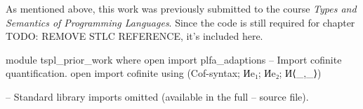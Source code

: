 As mentioned above, this work was previously submitted to the course \textit{Types and Semantics of
Programming Languages}. Since the code is still required for chapter
TODO: REMOVE STLC REFERENCE, it's included here.

\begin{code}
module tspl_prior_work where
  open import plfa_adaptions
  -- Import cofinite quantification.
  open import cofinite using (Cof-syntax; Иe₁; Иe₂; И⟨_,_⟩) 

  -- Standard library imports omitted (available in the full
  -- source file).
\end{code}
\begin{comment}
  \begin{code}
  -- Data types (naturals, strings, characters)
  open import Data.Nat using (ℕ; zero; suc; _<_; _≥_; _≤_; _≤?_; _<?_; z≤n; s≤s; _⊔_)
    renaming (_≟_ to _≟ℕ_)
  open import Data.Nat.Properties using (≤-refl; ≤-trans; ≤-<-trans; <-≤-trans; ≤-antisym; ≤-total;
    +-mono-≤; n≤1+n; m≤n⇒m≤1+n; suc-injective; <⇒≢; ≰⇒>; ≮⇒≥)
  open import Data.String using (String; fromList; toList) renaming (_≟_ to _≟str_;
    _++_ to _++str_; length to str-length)
  open import Data.Char using (Char)
  open import Data.Char.Properties using () renaming (_≟_ to _≟char_)
  
  -- Function manipulation.
  open import Function using (_∘_; flip; it; id; case_returning_of_)
  
  -- Relations and predicates/decidability.
  import Relation.Binary.PropositionalEquality as Eq
  open Eq using (_≡_; _≢_; refl; sym; trans; cong; cong-app; cong₂)
  open Eq.≡-Reasoning using (begin_; step-≡-∣; step-≡-⟩; _∎)
  open import Relation.Binary.Definitions using (DecidableEquality)
  open import Relation.Nullary.Decidable using (Dec; yes; no; True; False; toWitnessFalse;
    toWitness; fromWitness; ¬?; ⌊_⌋; From-yes)
  open import Relation.Unary using (Decidable)
  open import Relation.Binary using () renaming (Decidable to BinaryDecidable)
  open import Relation.Nullary.Negation using (¬_; contradiction)
  open import Data.Empty using (⊥-elim)
  
  -- Products and exists quantifier.
  open import Data.Product using (_×_; proj₁; proj₂; ∃-syntax) renaming (_,_ to ⟨_,_⟩)
  
  -- Lists.
  open import Data.List using (List; []; _∷_; _++_; length; filter; map; foldr; head; replicate)
  open import Data.List.Properties using (≡-dec)
  import Data.List.Membership.DecPropositional as DecPropMembership
  open import Data.List.Relation.Unary.All using (All; all?; lookup)
    renaming (fromList to All-fromList; toList to All-toList)
  open import Data.List.Relation.Unary.Any using (Any; here; there)
  open import Data.List.Extrema Data.Nat.Properties.≤-totalOrder using (max; xs≤max)
  
  -- Import list membership using List Char comparisons.
  private
    _≟lchar_ : ∀ (xs ys : List Char) → Dec (xs ≡ ys)
    xs ≟lchar ys = ≡-dec (_≟char_) xs ys
  
  open DecPropMembership _≟lchar_ using (_∈_; _∉_; _∈?_)

  \end{code}
\end{comment}

